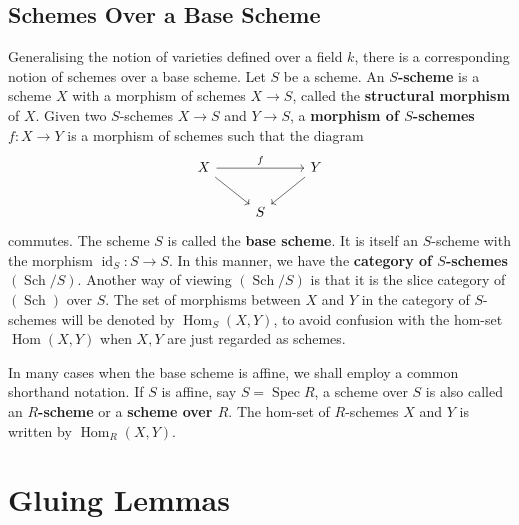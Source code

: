 \documentclass[12pt]{book}
\newcommand{\inlinedef}[1]{\textcolor{oxfordblue}{\bfseries #1}}
\theoremstyle{definition}
\newcommand{\Hom}{\operatorname{Hom}}
\newcommand{\id}{\operatorname{id}}
\DeclareMathOperator{\Spec}{Spec}
\newcommand{\Schs}{\operatorname{Sch}}
\begin{document}
	\subsection*{Schemes Over a Base Scheme}
	
	Generalising the notion of varieties defined over a field $k$, there is a corresponding notion of schemes over a base scheme. Let $S$ be a scheme. An \inlinedef{$S$-scheme} is a scheme $X$ with a morphism of schemes $X \to S$, called the \inlinedef{structural morphism} of $X$. Given two $S$-schemes $X \to S$ and $Y \to S$, a \inlinedef{morphism of $S$-schemes} $f \colon X \to Y$ is a morphism of schemes such that the diagram
	\[\begin{tikzcd}
		X && Y \\
		& S
		\arrow["f", from=1-1, to=1-3]
		\arrow[from=1-1, to=2-2]
		\arrow[from=1-3, to=2-2]
	\end{tikzcd}\]
	commutes. The scheme $S$ is called the \inlinedef{base scheme}. It is itself an $S$-scheme with the morphism $\id_S \colon S \to S$. In this manner, we have the \inlinedef{category of $S$-schemes} $(\Schs/S)$. Another way of viewing $(\Schs/S)$ is that it is the slice category of $(\Schs)$ over $S$. The set of morphisms between $X$ and $Y$ in the category of $S$-schemes will be denoted by $\Hom_S(X, Y)$, to avoid confusion with the hom-set $\Hom(X, Y)$ when $X, Y$ are just regarded as schemes.
	
	In many cases when the base scheme is affine, we shall employ a common shorthand notation. If $S$ is affine, say $S = \Spec R$, a scheme over $S$ is also called an \inlinedef{$R$-scheme} or a \inlinedef{scheme over $R$}. The hom-set of $R$-schemes $X$ and $Y$ is written by $\Hom_R(X, Y)$.
	
	\section{Gluing Lemmas}
	
\end{document}
